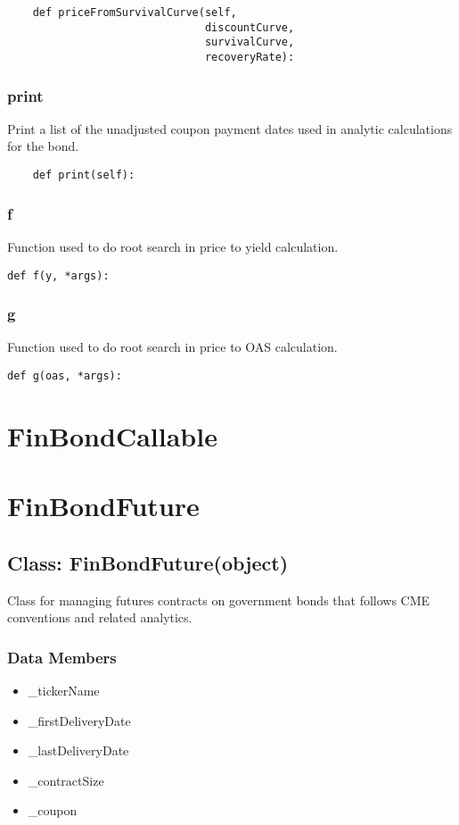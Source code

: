 \documentclass[twoside,11pt]{book}
\begin{document}
\begin{lstlisting}
    def priceFromSurvivalCurve(self,
                               discountCurve,
                               survivalCurve,
                               recoveryRate):
\end{lstlisting}

\subsubsection*{{\bf print}}
Print a list of the unadjusted coupon payment dates used in analytic calculations for the bond.  

\begin{lstlisting}
    def print(self):
\end{lstlisting}

\subsubsection*{{\bf f}}
Function used to do root search in price to yield calculation.  

\begin{lstlisting}
def f(y, *args):
\end{lstlisting}

\subsubsection*{{\bf g}}
Function used to do root search in price to OAS calculation.  

\begin{lstlisting}
def g(oas, *args):
\end{lstlisting}

\newpage
\section{FinBondCallable}

\newpage
\section{FinBondFuture}

\subsection*{Class: FinBondFuture(object)}
Class for managing futures contracts on government bonds that follows CME conventions and related analytics.  

\subsubsection*{Data Members}
\begin{itemize}
\item{\_tickerName}
\item{\_firstDeliveryDate}
\item{\_lastDeliveryDate}
\item{\_contractSize}
\item{\_coupon}
\end{itemize}
\end{document}
